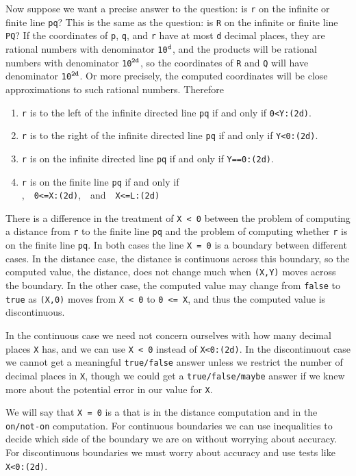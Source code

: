 \documentclass[12pt]{article}
\begin{document}
Now suppose we want a precise answer to the question: is {\tt r}
on the infinite or finite line {\tt pq}?  This is the same as the question:
is {\tt R} on the infinite or finite line {\tt PQ}?
If the coordinates of {\tt p}, {\tt q}, and {\tt r} have at
most {\tt d} decimal places, they are rational numbers with
denominator {\tt 10$^{\tt d}$}, and the products will be rational
numbers with denominator {\tt 10$^{\tt 2d}$}, so the coordinates of
{\tt R} and {\tt Q} will have denominator {\tt 10$^{\tt 2d}$}.
Or more precisely,
the computed coordinates will be close approximations to such rational numbers.
Therefore
\begin{enumerate}
\item {\tt r} is to the left of the infinite directed line {\tt pq}
if and only if {\tt 0<Y:(2d)}.
\item {\tt r} is to the right of the infinite directed line {\tt pq}
if and only if {\tt Y<0:(2d)}.
\item {\tt r} is on the infinite directed line {\tt pq}
if and only if {\tt Y==0:(2d)}.
\item {\tt r} is on the finite line {\tt pq} if and only if \\
\hspace*{0.3in}{\tt Y==0:(2d)},~~{\tt 0<=X:(2d)},~~and~~{\tt X<=L:(2d)}
\end{enumerate}

There is a difference in the treatment of {\tt X < 0} between
the problem of computing a distance from {\tt r} to the finite
line {\tt pq} and the problem of computing whether {\tt r} is
on the finite line {\tt pq}.  In both cases the line {\tt X = 0} is
a boundary between different cases.  In the distance case, the distance
is continuous across this boundary, so the computed value, the distance,
does not change much when {\tt (X,Y)} moves across the boundary.
In the other case, the computed value may change
from {\tt false} to {\tt true} as {\tt (X,0)} moves from {\tt X < 0}
to {\tt 0 <= X}, and thus the computed value is discontinuous.

In the continuous case we need not concern ourselves with how many
decimal places {\tt X} has, and we can use {\tt X < 0} instead of
{\tt X<0:(2d)}.  In the discontinuout case we cannot get a meaningful
{\tt true/false} answer unless we restrict the number of decimal
places in {\tt X}, though we could get a {\tt true/false/maybe}
answer if we knew more about the potential error in our value for
{\tt X}.

We will say that {\tt X = 0} is a  that is
 in the distance computation and 
in the {\tt on/not-on} computation.
For continuous boundaries we can use inequalities to decide which
side of the boundary we are on without worrying about accuracy.
For discontinuous boundaries we must worry about accuracy and
use tests like {\tt X<0:(2d)}.
\end{document}

